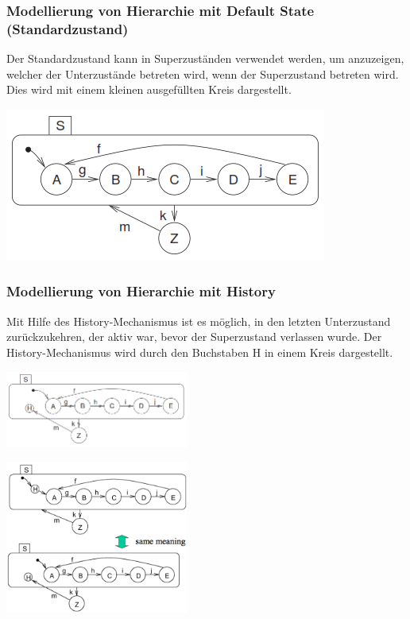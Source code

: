 \subsubsection{Modellierung von Hierarchie mit Default State (Standardzustand)}
\begin{multicols}{2}
Der Standardzustand kann in Superzuständen verwendet werden, um anzuzeigen, welcher der Unterzustände betreten wird, wenn der Superzustand betreten wird.
Dies wird mit einem kleinen ausgefüllten Kreis dargestellt.\\
\vfill\null
\columnbreak
\begin{center}
\includegraphics[width=0.6\linewidth]{images/FSM/Hierarchie_DefaultState}
\end{center}
\end{multicols}

\subsubsection{Modellierung von Hierarchie mit History}
Mit Hilfe des History-Mechanismus ist es möglich, in den letzten Unterzustand zurückzukehren, der aktiv war, bevor der Superzustand verlassen wurde. Der History-Mechanismus wird durch den Buchstaben H in
einem Kreis dargestellt.\\
\begin{minipage}[hbt]{8cm}
	\includegraphics[width=6cm]{images/FSM/Hierarchie_History}
\end{minipage}
\begin{minipage}[hbt]{6cm}
	\includegraphics[width = 6cm]{images/FSM/history_default_state_mechanism}
\end{minipage}
\pagebreak\newpage

